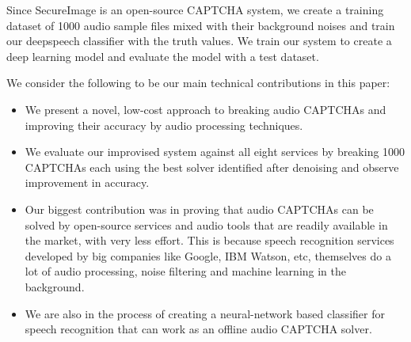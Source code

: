 Since SecureImage is an open-source CAPTCHA system, we create a training dataset of 1000 audio sample files mixed with their background noises and train our deepspeech classifier with the truth values. We train our system to create a deep learning model and evaluate the model with a test dataset.\newline

We consider the following to be our main technical contributions in this paper:

\begin{itemize}
\item We present a novel, low-cost approach to breaking audio CAPTCHAs and improving their accuracy by audio processing techniques.
\item We evaluate our improvised system against all eight services by breaking 1000 CAPTCHAs each using the best solver identified after denoising and observe improvement in accuracy. 
\item Our biggest contribution was in proving that audio CAPTCHAs can be solved by open-source services and audio tools that are readily available in the market, with very less effort. This is because speech recognition services developed by big companies like Google, IBM Watson, etc, themselves do a lot of audio processing, noise filtering and machine learning in the background.
\item We are also in the process of creating a neural-network based classifier for speech recognition that can work as an offline audio CAPTCHA solver.
\end{itemize}

